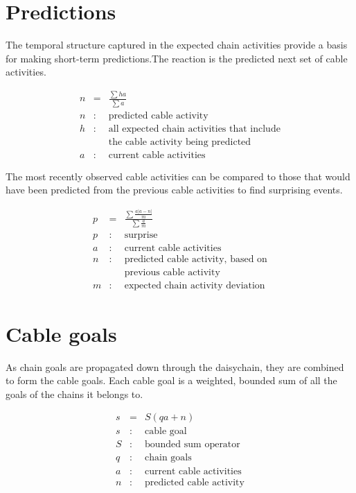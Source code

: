 \documentclass[oneside,twocolumn]{article}
\begin{document}
\section*{\color{copper} Predictions}

The temporal structure captured in the expected chain activities provide a basis for making short-term predictions.The reaction is the predicted next set of cable activities. 

\begin{eqnarray*}
n &= & \frac{\sum h a}{\sum{a}} \\
n &:& \mbox{predicted cable activity} \\
h &:& \mbox{all expected chain activities that include} \\
&& \mbox{the cable activity being predicted} \\
a &:& \mbox{current cable activities}
\end{eqnarray*}

The most recently observed cable activities can be compared to those that would have been predicted from the previous cable activities to find surprising events.

\begin{eqnarray*}
p &= &  \frac{\sum \frac{a | a - n |}{m}}{\sum{\frac{a}{m}}} \\
p &:& \mbox{surprise} \\
a &:& \mbox{current cable activities} \\
n &:& \mbox{predicted cable activity, based on} \\
&& \mbox{previous cable activity} \\
m &:& \mbox{expected chain activity deviation} 
\end{eqnarray*}

\section*{\color{copper} Cable goals}

As chain goals are propagated down through the daisychain, they are combined to form the cable goals. Each cable goal is a weighted, bounded sum of all the goals of the chains it belongs to.

\begin{eqnarray*}
s &= &  S(qa + n) \\
s &:& \mbox{cable goal} \\
S &:& \mbox{bounded sum operator} \\
q &:& \mbox{chain goals} \\
a &:& \mbox{current cable activities} \\
n &:& \mbox{predicted cable activity} \\
\end{eqnarray*}
\end{document}
